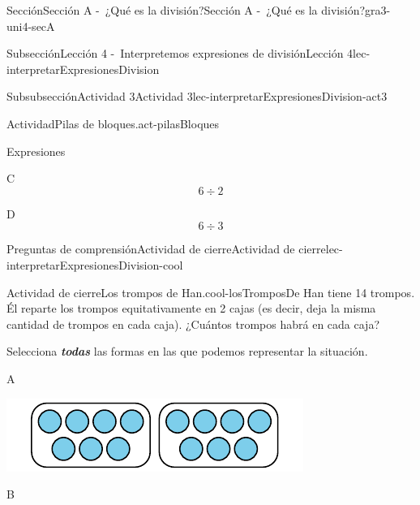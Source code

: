 \documentclass[twoside,10pt,]{article}
\newcommand{\alert}[1]{\textbf{\textit{#1}}}
\begin{document}
\begin{sectionptx}{Sección}{Sección A -~¿Qué es la división?}{}{Sección A -~¿Qué es la división?}{}{}{gra3-uni4-secA}
\begin{subsectionptx}{Subsección}{Lección 4 -~Interpretemos expresiones de división}{}{Lección 4}{}{}{lec-interpretarExpresionesDivision}
\begin{subsubsectionptx}{Subsubsección}{Actividad 3}{}{Actividad 3}{}{}{lec-interpretarExpresionesDivision-act3}
\begin{activity}{Actividad}{Pilas de bloques.}{act-pilasBloques}
\begin{sidebyside}{2}{0.05}{0.05}{0.1}
\begin{sbspanel}{0.4}
\end{sbspanel}%
\end{sidebyside}%
\par
Expresiones%
\begin{sidebyside}{2}{0.05}{0.05}{0.1}%
\begin{sbspanel}{0.4}%
C%
\begin{equation*}
6\div 2
\end{equation*}
%
\end{sbspanel}%
\begin{sbspanel}{0.4}%
\par
D%
\begin{equation*}
6\div 3
\end{equation*}
%
\end{sbspanel}%
\end{sidebyside}%
\end{activity}%
\end{subsubsectionptx}
%
%
\typeout{************************************************}
\typeout{************************************************}
%
\begin{reading-questions-subsubsection}{Preguntas de comprensión}{Actividad de cierre}{}{Actividad de cierre}{}{}{lec-interpretarExpresionesDivision-cool}
\begin{project}{Actividad de cierre}{Los trompos de Han.}{cool-losTromposDe}%
Han tiene 14 trompos. Él reparte los trompos equitativamente en 2 cajas (es decir, deja la misma cantidad de trompos en cada caja). ¿Cuántos trompos habrá en cada caja?%
\par
Selecciona \alert{todas} las formas en las que podemos representar la situación.%
\begin{sidebyside}{4}{0.0075}{0.0075}{0.015}%
\begin{sbspanel}{0.04}%
A%
\end{sbspanel}%
\begin{sbspanel}{0.43}%
\includegraphics[width=\linewidth]{external/svg-source/tikz-file-151100.pdf}
\end{sbspanel}%
\begin{sbspanel}{0.04}%
B%
\end{sbspanel}%

\end{sidebyside}
\end{project}
\end{reading-questions-subsubsection}
\end{subsectionptx}
\end{sectionptx}
\end{document}
